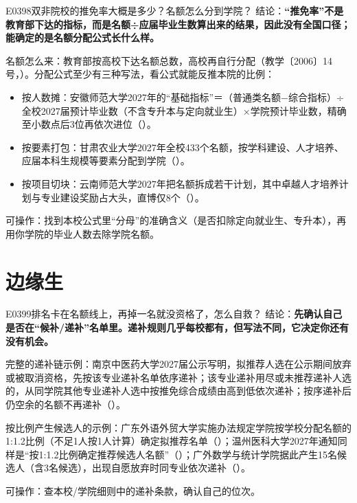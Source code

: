 \begin{qa}{E0398}{双非院校的推免率大概是多少？名额怎么分到学院？}
结论：\textbf{“推免率”不是教育部下达的指标，而是名额÷应届毕业生数算出来的结果，因此没有全国口径；能确定的是名额分配公式长什么样。}

名额怎么来：教育部按高校下达名额总数，高校再自行分配（教学〔2006〕14号，）。分配公式至少有三种写法，看公式就能反推本院的比例：

\begin{itemize}
  \item 按人数摊：安徽师范大学2027年的“基础指标”＝（普通类名额−综合指标）÷全校2027届预计毕业数（不含专升本与定向就业生）×学院预计毕业数，精确至小数点后3位再依次进位（）。
  \item 按要素打包：甘肃农业大学2027年全校433个名额，按学科建设、人才培养、应届本科生规模等要素分配到学院（）。
  \item 按项目切块：云南师范大学2027年把名额拆成若干计划，其中卓越人才培养计划与专业建设奖励占大头，直博仅8个（）。
\end{itemize}

可操作：找到本校公式里“分母”的准确含义（是否扣除定向就业生、专升本），再用你学院的毕业人数去除学院名额。
\end{qa}

\section{边缘生}
\begin{qa}{E0399}{排名卡在名额线上，再掉一名就没资格了，怎么自救？}
结论：\textbf{先确认自己是否在“候补/递补”名单里。递补规则几乎每校都有，但写法不同，它决定你还有没有机会。}

完整的递补链示例：南京中医药大学2027届公示写明，拟推荐人选在公示期间放弃或被取消资格，先按该专业递补名单依序递补；该专业递补用尽或未推荐递补人选的，从同学院其他专业递补人选中按推免综合成绩由高到低依次递补；按序递补后仍空余的名额不再递补（）。

按比例产生候选人的示例：广东外语外贸大学实施办法规定学院按学校分配名额的1:1.2比例（不足1人按1人计算）确定拟推荐名单（）；温州医科大学2027年通知同样是“按1:1.2比例确定推荐候选人名额”（）；广外数学与统计学院据此产生15名候选人（含3名候选），出现自愿放弃时同专业依次递补（）。

可操作：查本校/学院细则中的递补条款，确认自己的位次。
\end{qa}

